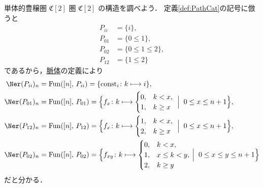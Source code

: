 \documentclass[TQFT_main]{subfiles}
\begin{document}
\begin{myexample}[label=ex:PathCat2]{単体的豊穣圏 {$\mathfrak{C}[2]$}}
    圏 \hyperref[def:PathCat]{$\mathfrak{C}[2]$} の構造を調べよう．
    定義\ref{def:PathCat}の記号に倣うと
    \begin{align}
        P_{ii} &= \{i\}, \\
        P_{01} &= \{0 \le 1\}, \\
        P_{02} &= \{0 \le 1 \le 2\}, \\
        P_{12} &= \{1 \le 2\}
    \end{align}
    であるから，\hyperref[def:nerve]{脈体}の定義により
    \begin{align}
        \Ner (P_{ii})_n &= \mathrm{Fun}([n],\, P_{ii}) = \{\mathrm{const}_{i} \colon k \lmto i\}, \\
        \Ner (P_{01})_n &= \mathrm{Fun}([n],\, P_{01}) = 
        \Bigl\{ 
            f_{x} \colon k \lmto
            \begin{cases}
                0, &k < x, \\
                1, &k \ge x
            \end{cases}\;
        \Bigm|\; 0 \le x \le n+1
        \Bigr\}, \\
        \Ner (P_{12})_n &= \mathrm{Fun}([n],\, P_{12}) = 
        \Bigl\{ 
            f_{x} \colon k \lmto
            \begin{cases}
                1, &k < x, \\
                2, &k \ge x
            \end{cases}\;
        \Bigm|\; 0 \le x \le n+1
        \Bigr\}, \\
        \Ner (P_{02})_n &= \mathrm{Fun}([n],\, P_{02}) = 
        \Bigl\{ 
            f_{xy} \colon k \lmto 
            \begin{cases}
                0, &k < x, \\
                1, &x \le k < y, \\
                2, &k \ge y
            \end{cases}
        \Bigm|\; 0 \le x \le y \le n+1
         \Bigr\} 
    \end{align}
    だと分かる．
\end{myexample}
\end{document}
